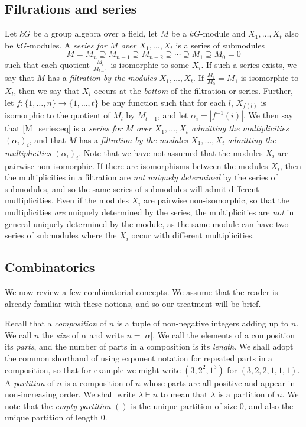 \documentclass[10pt]{article}
\theoremstyle{definition}
\begin{document}
\subsection{Filtrations and series}\label{filt_ser:subsec}
Let $kG$ be a group algebra over a field, let $M$ be a $kG$-module and $X_1,\ldots,X_t$ also be $kG$-modules. A \textit{series for $M$
over $X_1,\ldots,X_t$} is a series of submodules
\begin{equation}\label{M_series:eq}
  M = M_n \supseteq M_{n-1} \supseteq M_{n-2} \supseteq \cdots \supseteq M_1 \supseteq M_0 = 0
\end{equation}
such that each quotient $\frac{M_l}{M_{l-1}}$ is isomorphic to some $X_i$. If such a series exists, we say that $M$ has a
\textit{filtration by the modules $X_1,\ldots,X_t$}. If $\frac{M_1}{M_0} = M_1$ is isomorphic to $X_l$, then we say that $X_l$ occurs at
the \textit{bottom} of the filtration or series. Further, let $f:\{1,\ldots,n\} \longrightarrow \{1,\ldots,t\}$ be any function such
that for each $l$, $X_{f(l)}$ is isomorphic to the quotient of $M_l$ by $M_{l-1}$, and let $\alpha_i = |f^{-1}(i)|$. We then say that
\eqref{M_series:eq}
is a \textit{series for $M$ over $X_1,\ldots,X_t$ admitting the multiplicities $(\alpha_i)_i$}, and that $M$ has a
\textit{filtration by the modules $X_1,\ldots,X_t$ admitting the multiplicities $(\alpha_i)_i$}.
Note that we have not assumed that the modules $X_i$ are pairwise non-isomorphic. If there are isomorphisms between the modules
$X_i$, then the multiplicities in a filtration are \textit{not uniquely determined} by the series of submodules, and so the same series
of submodules will admit different multiplicities. Even if the modules $X_i$ are pairwise non-isomorphic, so that the multiplicities
\textit{are} uniquely determined by the series, the multiplicities are \textit{not} in general uniquely determined by the module,
as the same module can have two series of submodules where the $X_i$ occur with different multiplicities.

\subsection{Combinatorics}
We now review a few combinatorial concepts. We assume that the reader is already familiar with these notions, and so our treatment will
be brief.

Recall that a \textit{composition} of $n$ is a tuple of non-negative integers adding up to $n$. We call $n$ the \textit{size} of $\alpha$
and write $n = |\alpha|$. We call the elements of a composition its \textit{parts}, and the number of parts in a composition is its
\textit{length}. We shall adopt the common shorthand of using exponent
notation for repeated parts in a composition, so that for example we might write $(3,2^2,1^3)$ for $(3,2,2,1,1,1)$.
A \textit{partition} of $n$ is a composition of $n$ whose parts are all positive and appear in non-increasing order. We shall write
$\lambda \vdash n$ to mean that $\lambda$ is a partition of $n$. We note that the \textit{empty partition} $()$ is the unique partition
of size 0, and also the unique partition of length 0.
\end{document}

